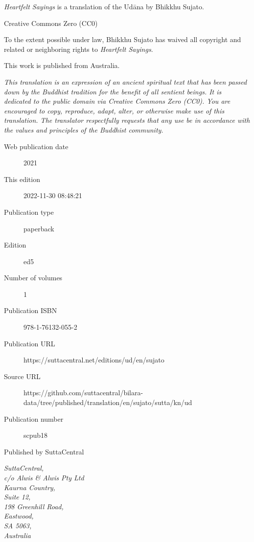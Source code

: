 \documentclass[12pt,openany]{book}%
\begin{document}
\begin{footnotesize}

\textit{Heartfelt Sayings} is a translation of the Udāna by Bhikkhu Sujato.

\medskip

Creative Commons Zero (CC0)

To the extent possible under law, Bhikkhu Sujato has waived all copyright and related or neighboring rights to \textit{Heartfelt Sayings}.

\medskip

This work is published from Australia.

\begin{center}
\textit{This translation is an expression of an ancient spiritual text that has been passed down by the Buddhist tradition for the benefit of all sentient beings. It is dedicated to the public domain via Creative Commons Zero (CC0). You are encouraged to copy, reproduce, adapt, alter, or otherwise make use of this translation. The translator respectfully requests that any use be in accordance with the values and principles of the Buddhist community.}
\end{center}

\medskip

\begin{description}
    \item[Web publication date] 2021
    \item[This edition] 2022-11-30 08:48:21
    \item[Publication type] paperback
    \item[Edition] ed5
    \item[Number of volumes] 1
    \item[Publication ISBN] 978-1-76132-055-2
    \item[Publication URL] https://suttacentral.net/editions/ud/en/sujato
    \item[Source URL] https://github.com/suttacentral/bilara-data/tree/published/translation/en/sujato/sutta/kn/ud
    \item[Publication number] scpub18
\end{description}

\medskip

Published by SuttaCentral

\medskip

\textit{SuttaCentral,\\
c/o Alwis \& Alwis Pty Ltd\\
Kaurna Country,\\
Suite 12,\\
198 Greenhill Road,\\
Eastwood,\\
SA 5063,\\
Australia}

\end{footnotesize}
\end{document}
